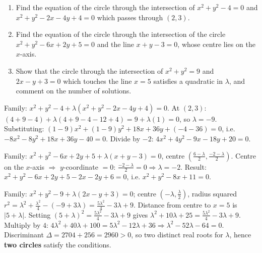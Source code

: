 \documentclass[11pt]{article}
\begin{document}
\begin{exercice}[Practice]
\begin{enumerate}
  \item Find the equation of the circle through the intersection of $x^2 + y^2 - 4 = 0$ and $x^2 + y^2 - 2x - 4y + 4 = 0$ which passes through $(2, 3)$.
  \item Find the equation of the circle through the intersection of the circle $x^2 + y^2 - 6x + 2y + 5 = 0$ and the line $x + y - 3 = 0$, whose centre lies on the $x$-axis.
  \item Show that the circle through the intersection of $x^2 + y^2 = 9$ and $2x - y + 3 = 0$ which touches the line $x = 5$ satisfies a quadratic in $\lambda$, and comment on the number of solutions.
\end{enumerate}
\end{exercice}

\begin{corrige}[Exercise 1]
Family: $x^2 + y^2 - 4 + \lambda(x^2 + y^2 - 2x - 4y + 4) = 0$. At $(2,3)$: $(4+9-4) + \lambda(4+9-4-12+4) = 9 + \lambda(1) = 0$, so $\lambda = -9$. Substituting: $(1-9)x^2 + (1-9)y^2 + 18x + 36y + (-4-36) = 0$, i.e. $-8x^2 - 8y^2 + 18x + 36y - 40 = 0$. Divide by $-2$: $\boxed{4x^2 + 4y^2 - 9x - 18y + 20 = 0}$.
\end{corrige}

\begin{corrige}[Exercise 2]
Family: $x^2 + y^2 - 6x + 2y + 5 + \lambda(x + y - 3) = 0$, centre $\left(\frac{6-\lambda}{2}, \frac{-2-\lambda}{2}\right)$. Centre on the $x$-axis $\Rightarrow$ $y$-coordinate $= 0$: $\frac{-2-\lambda}{2} = 0 \Rightarrow \lambda = -2$. Result: $x^2 + y^2 - 6x + 2y + 5 -2x -2y + 6 = 0$, i.e. $\boxed{x^2 + y^2 - 8x + 11 = 0}$.
\end{corrige}

\begin{corrige}[Exercise 3]
Family: $x^2 + y^2 - 9 + \lambda(2x - y + 3) = 0$; centre $(-\lambda, \frac{\lambda}{2})$, radius squared $r^2 = \lambda^2 + \frac{\lambda^2}{4} - (-9+3\lambda) = \frac{5\lambda^2}{4} - 3\lambda + 9$. Distance from centre to $x = 5$ is $|5 + \lambda|$. Setting $(5+\lambda)^2 = \frac{5\lambda^2}{4} - 3\lambda + 9$ gives $\lambda^2 + 10\lambda + 25 = \frac{5\lambda^2}{4} - 3\lambda + 9$. Multiply by $4$: $4\lambda^2 + 40\lambda + 100 = 5\lambda^2 - 12\lambda + 36 \Rightarrow \lambda^2 - 52\lambda - 64 = 0$. Discriminant $\Delta = 2704 + 256 = 2960 > 0$, so two distinct real roots for $\lambda$, hence \textbf{two circles} satisfy the conditions.
\end{corrige}
\end{document}
